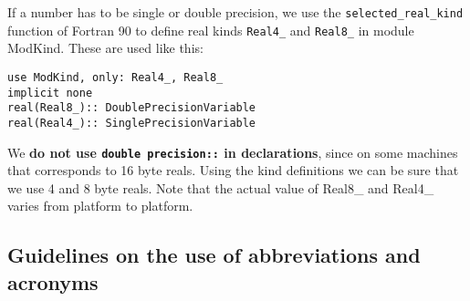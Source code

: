 \documentclass{article}
\begin{document}
If a number has to be single or double precision, we use
the {\tt selected\_real\_kind} function of Fortran 90 to define 
real kinds {\tt Real4\_} and {\tt Real8\_} in module ModKind.
These are used like this:
\begin{verbatim}
use ModKind, only: Real4_, Real8_
implicit none
real(Real8_):: DoublePrecisionVariable
real(Real4_):: SinglePrecisionVariable
\end{verbatim}
We {\bf do not use {\tt double precision::} in declarations}, 
since on some machines that corresponds to 16 byte reals.
Using the kind definitions we can be sure that we use 4 and 8 byte reals.
Note that the actual value of Real8\_ and Real4\_ varies from 
platform to platform.
 

\subsection{Guidelines on the use of abbreviations and acronyms}
\end{document}
